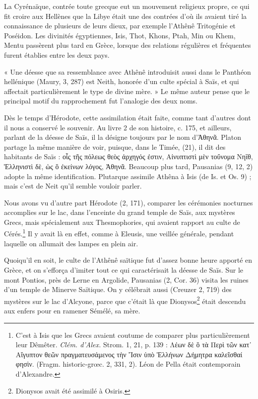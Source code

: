 \documentclass[a4paper, 11pt, oneside]{article}
\begin{document}
La Cyrénaïque, contrée toute grecque eut un mouvement religieux propre, ce qui fit croire aux Hellènes que la Libye était une des contrées d'où ils avaient tiré la connaissance de plusieurs de leurs dieux, par exemple l'Athênê Tritogénie et Poséidon. Les divinités égyptiennes, Isis, Thot, Khons, Ptah, Min ou Khem, Mentu passèrent plus tard en Grèce, lorsque des relations régulières et fréquentes furent établies entre les deux pays.

« Une déesse que sa ressemblance avec Athênê introduisit aussi dans le Panthéon hellénique (Maury, 3, 287) est Neith, honorée d'un culte spécial à Saïs, et qui affectait particulièrement le type de divine mère. » Le même auteur pense que le principal motif du rapprochement fut l'analogie des deux noms.

Dès le temps d'Hérodote, cette assimilation était faite, comme tant d'autres dont il nous a conservé le souvenir. Au livre 2 de son histoire, c. 175, et ailleurs, parlant de la déesse de Saïs, il la désigne toujours par le nom d'Ἀθηνᾶ. Platon partage la même manière de voir, puisque, dans le Timée, (21), il dit des habitants de Saïs : οἷς τῆς πόλεως θεὸς ἀρχηγός ἐστιν, Αἰνυπτιστὶ μὲν τοὔνομα Νηΐθ, Ἑλληνιστὶ δὲ, ὡς ὃ ἐκείνων λόγος, Ἀθηνᾶ. Beaucoup plus tard, Pausanias (9, 12, 2) adopte la même identification. Plutarque assimile Athêna à Isis (de Is. et Os. 9) ; mais c'est de Neit qu'il semble vouloir parler.

Nous avons vu d'autre part Hérodote (2, 171), comparer les cérémonies nocturnes accomplies sur le lac, dans l'enceinte du grand temple de Saïs, aux mystères Grecs, mais spécialement aux Thesmophories, qui avaient rapport au culte de Cérés.\footnote{C'est à Isis que les Grecs avaient coutume de comparer plus particulièrement leur Dêmêter. \emph{Clém. d'Alex.} Strom. 1, 21, p. 139 : Λέων δὲ ὃ τὰ Περὶ τῶν κατ᾽ Αἴγυπτον θεῶν πραγματευσάμενος τὴν Ἴσιν ὑπὸ Ἑλλήνων Δήμητρα καλεῖσθαί φησὶν. (Fragm. historic-grœc. 2, 331, 2). Léon de Pella était contemporain d'Alexandre.} Il y avait là en effet, comme à Eleusis, une veillée générale, pendant laquelle on allumait des lampes en plein air.

Quoiqu'il en soit, le culte de l'Athênê saïtique fut d'assez bonne heure apporté en Grèce, et on s'efforça d'imiter tout ce qui caractérisait la déesse de Saïs. Sur le mont Pontios, près de Lerne en Argolide, Pausanias (2, Cor. 36) visita les ruines d'un temple de Minerve Saïtique. On y célébrait aussi (Creuzer 2, 719) des mystères sur le lac d'Alcyone, parce que c'était là que Dionysos\footnote{Dionysos avait été assimilé à Osiris.} était descendu aux enfers pour en ramener Sémélé, sa mère.
\end{document}
